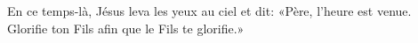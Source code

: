 En ce temps-là, Jésus leva les yeux au ciel et dit:
	«Père, l’heure est venue.
Glorifie ton Fils afin que le Fils te glorifie.»
